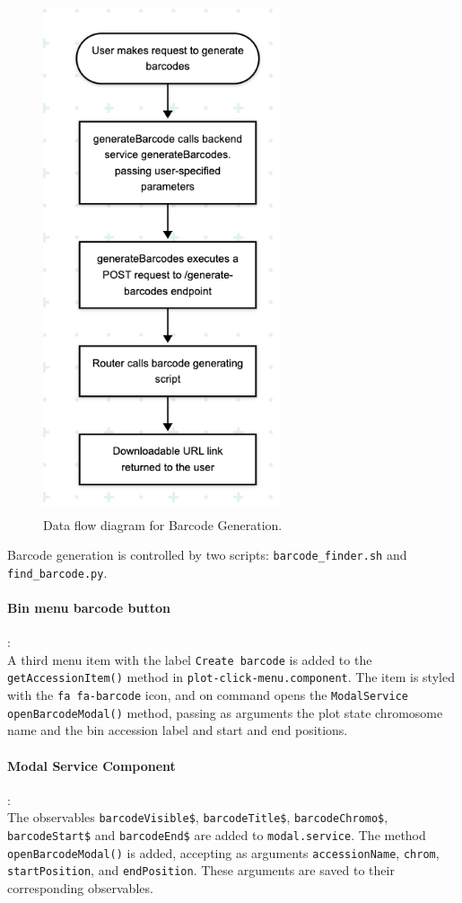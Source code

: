 \documentclass[12pt]{article}
\begin{document}
\begin{figure}[h]
    \centering
    \includegraphics[width=7cm, height=15cm]{Bar2.png}
    \caption{Data flow diagram for Barcode Generation.}
\end{figure}

Barcode generation is controlled by two scripts: \verb+barcode_finder.sh+ and \verb+find_barcode.py+. 

\paragraph{Bin menu barcode button}:\\
A third menu item with the label \verb+Create barcode+ is added to the \verb+getAccessionItem()+ method in \verb+plot-click-menu.component+. The item is styled with the \verb+fa fa-barcode+ icon, and on command opens the \verb+ModalService openBarcodeModal()+ method, passing as arguments the plot state chromosome name and the bin accession label and start and end positions.

\paragraph{Modal Service Component}:\\
The observables \verb+barcodeVisible$+, \verb+barcodeTitle$+, \verb+barcodeChromo$+, \verb+barcodeStart$+ and \verb+barcodeEnd$+ are added to \verb+modal.service+. The method \verb+openBarcodeModal()+ is added, accepting as arguments \verb+accessionName+, \verb+chrom+, \verb+startPosition+, and \verb+endPosition+. These arguments are saved to their corresponding observables.  
\end{document}
